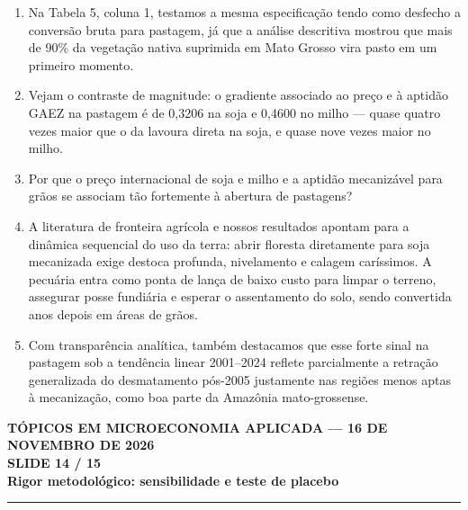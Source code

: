 \documentclass[11pt,a4paper]{article}
\newcommand{\slidenum}{1}
\begin{document}
\vspace{0.8mm}
\begin{enumerate}[leftmargin=*,label=\textbf{(\arabic*)},itemsep=2.8mm,topsep=1mm]
    \item Na Tabela 5, coluna 1, testamos a mesma especificação tendo como desfecho a conversão bruta para pastagem, já que a análise descritiva mostrou que mais de 90\% da vegetação nativa suprimida em Mato Grosso vira pasto em um primeiro momento.
    \item Vejam o contraste de magnitude: o gradiente associado ao preço e à aptidão GAEZ na pastagem é de 0,3206 na soja e 0,4600 no milho — quase quatro vezes maior que o da lavoura direta na soja, e quase nove vezes maior no milho.
    \item Por que o preço internacional de soja e milho e a aptidão mecanizável para grãos se associam tão fortemente à abertura de pastagens?
    \item A literatura de fronteira agrícola e nossos resultados apontam para a dinâmica sequencial do uso da terra: abrir floresta diretamente para soja mecanizada exige destoca profunda, nivelamento e calagem caríssimos. A pecuária entra como ponta de lança de baixo custo para limpar o terreno, assegurar posse fundiária e esperar o assentamento do solo, sendo convertida anos depois em áreas de grãos.
    \item Com transparência analítica, também destacamos que esse forte sinal na pastagem sob a tendência linear 2001–2024 reflete parcialmente a retração generalizada do desmatamento pós-2005 justamente nas regiões menos aptas à mecanização, como boa parte da Amazônia mato-grossense.
\end{enumerate}

\newpage

\renewcommand{\slidenum}{14}
\noindent
\begin{minipage}{\textwidth}
\begin{center}
{\color{cinza}\footnotesize\textbf{TÓPICOS EM MICROECONOMIA APLICADA --- 16 DE NOVEMBRO DE 2026}\\[1.2mm]}
{\color{cinza}\bfseries\Large SLIDE 14 / 15\\[1.5mm]}
{\color{verde}\bfseries\LARGE Rigor metodológico: sensibilidade e teste de placebo\\[2.5mm]}
\rule{\textwidth}{1pt}
\end{center}
\end{minipage}
\vspace{1.5mm}
\end{document}
